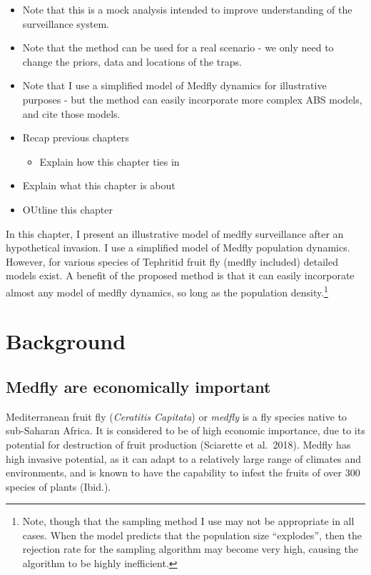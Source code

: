 \documentclass[
]{book}
\providecommand{\tightlist}{%
  \setlength{\itemsep}{0pt}\setlength{\parskip}{0pt}}
\begin{document}
\begin{itemize}
\item
  Note that this is a mock analysis intended to improve understanding of the surveillance system.
\item
  Note that the method can be used for a real scenario - we only need to change the priors, data and locations of the traps.
\item
  Note that I use a simplified model of Medfly dynamics for illustrative purposes - but the method can easily incorporate more complex ABS models, and cite those models.
\item
  Recap previous chapters

  \begin{itemize}
  \tightlist
  \item
    Explain how this chapter ties in
  \end{itemize}
\item
  Explain what this chapter is about
\item
  OUtline this chapter
\end{itemize}

In this chapter, I present an illustrative model of medfly surveillance after an hypothetical invasion. I use a simplified model of Medfly population dynamics. However, for various species of Tephritid fruit fly (medfly included) detailed models exist. A benefit of the proposed method is that it can easily incorporate almost any model of medfly dynamics, so long as the population density.\footnote{Note, though that the sampling method I use may not be appropriate in all cases. When the model predicts that the population size ``explodes'', then the rejection rate for the sampling algorithm may become very high, causing the algorithm to be highly inefficient.}

\hypertarget{background}{%
\section{Background}\label{background}}

\hypertarget{medfly-are-economically-important}{%
\subsection{Medfly are economically important}\label{medfly-are-economically-important}}

Mediterranean fruit fly (\emph{Ceratitis Capitata}) or \emph{medfly} is a fly species native to sub-Saharan Africa. It is considered to be of high economic importance, due to its potential for destruction of fruit production (Sciarette et al.~2018). Medfly has high invasive potential, as it can adapt to a relatively large range of climates and environments, and is known to have the capability to infest the fruits of over 300 species of plants (Ibid.).
\end{document}
